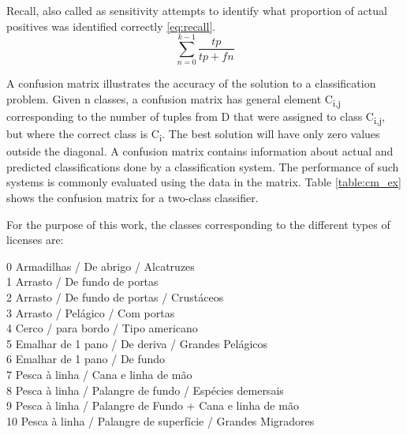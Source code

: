 Recall, also called as sensitivity attempts to identify what proportion of actual positives was identified correctly \ref{eq:recall}. \\
\begin{equation}
\sum_{n=0}^{k-1}\frac{tp}{tp+fn} 
\label{eq:recall}
\end{equation}




A confusion matrix \cite{CMPatil} illustrates the accuracy of the solution to a classification problem. Given n classes, a confusion matrix has general element C\textsubscript{i,j} corresponding to the number of tuples from D that were assigned to class C\textsubscript{i,j}, but where the correct class is C\textsubscript{i}.
The best solution will have only zero values outside the diagonal.
A confusion matrix contains information about actual and predicted classifications done by a classification system. The performance of such systems is commonly evaluated using the data in the matrix. Table \ref{table:cm_ex} shows the confusion matrix for a two-class classifier. 

For the purpose of this work, the classes corresponding to the different types of licenses are: 

0 Armadilhas / De abrigo / Alcatruzes \\
1 Arrasto / De fundo de portas \\
2 Arrasto / De fundo de portas / Crustáceos\\
3 Arrasto / Pelágico / Com portas\\
4 Cerco / para bordo / Tipo americano\\
5 Emalhar de 1 pano / De deriva / Grandes Pelágicos\\
6 Emalhar de 1 pano / De fundo\\
7 Pesca à linha / Cana e linha de mão\\
8 Pesca à linha / Palangre de fundo / Espécies demersais\\
9 Pesca à linha / Palangre de Fundo + Cana e linha de mão\\
10 Pesca à linha / Palangre de superfície / Grandes Migradores



